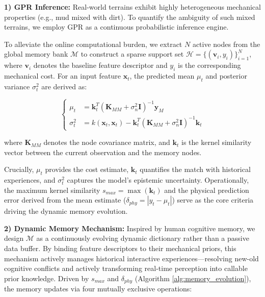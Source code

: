 \documentclass[letterpaper, 10 pt, conference]{ieeeconf}  %
\begin{document}
\textbf{1) GPR Inference:} Real-world terrains exhibit highly heterogeneous mechanical properties (e.g., mud mixed with dirt). To quantify the ambiguity of such mixed terrains, we employ GPR as a continuous probabilistic inference engine.

To alleviate the online computational burden, we extract $N$ active nodes from the global memory bank $\mathcal{M}$ to construct a sparse support set $\mathcal{H} = \{(\mathbf{v}_i, y_i)\}_{i=1}^N$, where $\mathbf{v}_i$ denotes the baseline feature descriptor and $y_i$ is the corresponding mechanical cost. For an input feature $\mathbf{x}_t$, the predicted mean $\mu_t$ and posterior variance $\sigma_t^2$ are derived as:

\begin{equation}
\label{eq:gpr_inference}
\left\{
\begin{aligned}
\mu_t &= \mathbf{k}_t^T (\mathbf{K}_{MM} + \sigma_n^2 \mathbf{I})^{-1} \mathbf{y}_M \\
\sigma_t^2 &= k(\mathbf{x}_t, \mathbf{x}_t) - \mathbf{k}_t^T (\mathbf{K}_{MM} + \sigma_n^2 \mathbf{I})^{-1}\mathbf{k}_t
\end{aligned}
\right.
\end{equation}

where $\mathbf{K}_{MM}$ denotes the node covariance matrix, and $\mathbf{k}_t$ is the kernel similarity vector between the current observation and the memory nodes. 

Crucially, $\mu_t$ provides the cost estimate, $\mathbf{k}_t$ quantifies the match with historical experiences, and $\sigma_t^2$ captures the model's epistemic uncertainty. Operationally, the maximum kernel similarity $s_{max} = \max(\mathbf{k}_t)$ and the physical prediction error derived from the mean estimate ($\delta_{phy} = |y_t - \mu_t|$) serve as the core criteria driving the dynamic memory evolution.

\textbf{2) Dynamic Memory Mechanism:} Inspired by human cognitive memory, we design $\mathcal{M}$ as a continuously evolving dynamic dictionary rather than a passive data buffer. By binding feature descriptors to their mechanical priors, this mechanism actively manages historical interactive experiences—resolving new-old cognitive conflicts and actively transforming real-time perception into callable prior knowledge. Driven by $s_{max}$ and $\delta_{phy}$ (Algorithm \ref{alg:memory_evolution}), the memory updates via four mutually exclusive operations:
\end{document}
